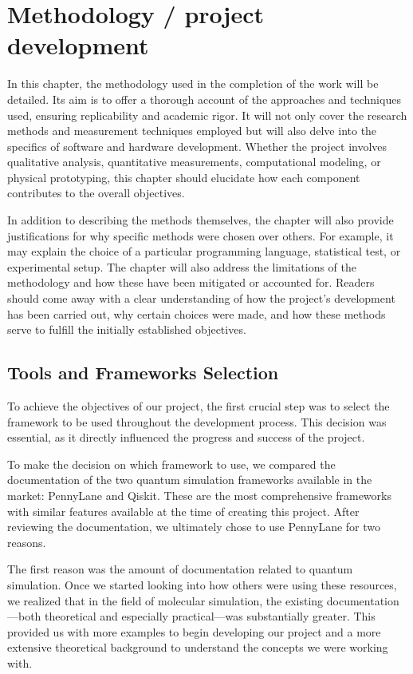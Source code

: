 

\chapter{Methodology / project development}

In this chapter, the methodology used in the completion of the work will be detailed. Its aim is to offer a thorough account of the approaches and techniques used, ensuring replicability and academic rigor. It will not only cover the research methods and measurement techniques employed but will also delve into the specifics of software and hardware development. Whether the project involves qualitative analysis, quantitative measurements, computational modeling, or physical prototyping, this chapter should elucidate how each component contributes to the overall objectives.

In addition to describing the methods themselves, the chapter will also provide justifications for why specific methods were chosen over others. For example, it may explain the choice of a particular programming language, statistical test, or experimental setup. The chapter will also address the limitations of the methodology and how these have been mitigated or accounted for. Readers should come away with a clear understanding of how the project's development has been carried out, why certain choices were made, and how these methods serve to fulfill the initially established objectives.

\section{Tools and Frameworks Selection}
To achieve the objectives of our project, the first crucial step was to select the framework to be used throughout the development process. This decision was essential, as it directly influenced the progress and success of the project.

To make the decision on which framework to use, we compared the documentation of the two quantum simulation frameworks available in the market: PennyLane and Qiskit. These are the most comprehensive frameworks with similar features available at the time of creating this project. After reviewing the documentation, we ultimately chose to use PennyLane for two reasons.

The first reason was the amount of documentation related to quantum simulation. Once we started looking into how others were using these resources, we realized that in the field of molecular simulation, the existing documentation—both theoretical and especially practical—was substantially greater. This provided us with more examples to begin developing our project and a more extensive theoretical background to understand the concepts we were working with.

